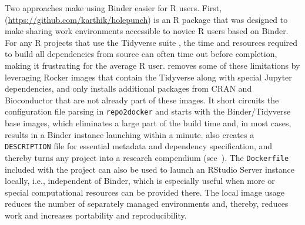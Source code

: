 Two approaches make using Binder easier for R users. First,
\textbf{} (\url{https://github.com/karthik/holepunch}) is
an R package that was designed to make sharing work environments
accessible to novice R users based on Binder. For any R projects that
use the Tidyverse suite \citep{wickham_welcome_2019}, the time and
resources required to build all dependencies from source can often time
out before completion, making it frustrating for the average R user.
 removes some of these limitations by leveraging Rocker
images that contain the Tidyverse along with special Jupyter
dependencies, and only installs additional packages from CRAN and
Bioconductor that are not already part of these images. It short
circuits the configuration file parsing in \texttt{repo2docker} and
starts with the Binder/Tidyverse base images, which eliminates a large
part of the build time and, in most cases, results in a Binder instance
launching within a minute.  also creates a
\texttt{DESCRIPTION} file for essential metadata and dependency
specification, and thereby turns any project into a research compendium
(see~). The \texttt{Dockerfile} included with the
project can also be used to launch an RStudio Server instance locally,
i.e., independent of Binder, which is especially useful when more or
special computational resources can be provided there. The local image
usage reduces the number of separately managed environments and,
thereby, reduces work and increases portability and reproducibility.


